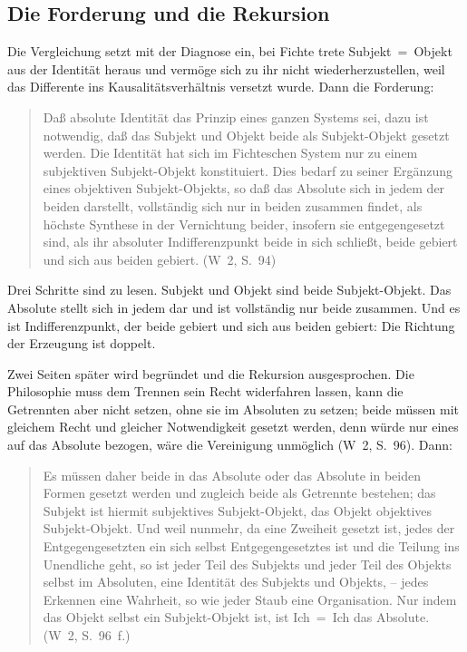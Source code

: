 \documentclass[11pt,a4paper]{article}
\newcommand{\SO}{Subjekt-Objekt}
\newcommand{\Werke}[1]{(W~2, S.~#1)}
\begin{document}
\subsection{Die Forderung und die Rekursion}

Die Vergleichung setzt mit der Diagnose ein, bei Fichte trete Subjekt~=~Objekt aus der Identität heraus und vermöge sich zu ihr nicht wiederherzustellen, weil das Differente ins Kausalitätsverhältnis versetzt wurde. Dann die Forderung:

\begin{quote}
\glqq Daß absolute Identität das Prinzip eines ganzen Systems sei, dazu ist notwendig, daß das Subjekt und Objekt beide als \SO{} gesetzt werden. Die Identität hat sich im Fichteschen System nur zu einem subjektiven \SO{} konstituiert. Dies bedarf zu seiner Ergänzung eines objektiven \SO{}s, so daß das Absolute sich in jedem der beiden darstellt, vollständig sich nur in beiden zusammen findet, als höchste Synthese in der Vernichtung beider, insofern sie entgegengesetzt sind, als ihr absoluter Indifferenzpunkt beide in sich schließt, beide gebiert und sich aus beiden gebiert.\grqq{} \Werke{94}
\end{quote}

Drei Schritte sind zu lesen. Subjekt und Objekt sind beide \SO{}. Das Absolute stellt sich in jedem dar und ist vollständig nur beide zusammen. Und es ist Indifferenzpunkt, der beide gebiert und sich aus beiden gebiert: Die Richtung der Erzeugung ist doppelt.

Zwei Seiten später wird begründet und die Rekursion ausgesprochen. Die Philosophie muss dem Trennen sein Recht widerfahren lassen, kann die Getrennten aber nicht setzen, ohne sie im Absoluten zu setzen; beide müssen mit gleichem Recht und gleicher Notwendigkeit gesetzt werden, denn würde nur eines auf das Absolute bezogen, wäre die Vereinigung unmöglich \Werke{96}. Dann:

\begin{quote}
\glqq Es müssen daher beide in das Absolute oder das Absolute in beiden Formen gesetzt werden und zugleich beide als Getrennte bestehen; das Subjekt ist hiermit subjektives \SO{}, das Objekt objektives \SO{}. Und weil nunmehr, da eine Zweiheit gesetzt ist, jedes der Entgegengesetzten ein sich selbst Entgegengesetztes ist und die Teilung ins Unendliche geht, so ist jeder Teil des Subjekts und jeder Teil des Objekts selbst im Absoluten, eine Identität des Subjekts und Objekts, -- jedes Erkennen eine Wahrheit, so wie jeder Staub eine Organisation. Nur indem das Objekt selbst ein \SO{} ist, ist Ich~=~Ich das Absolute.\grqq{} \Werke{96~f.}
\end{quote}
\end{document}
